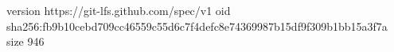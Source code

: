 version https://git-lfs.github.com/spec/v1
oid sha256:fb9b10cebd709cc46559c55d6c7f4defc8e74369987b15df9f309b1bb15a3f7a
size 946
